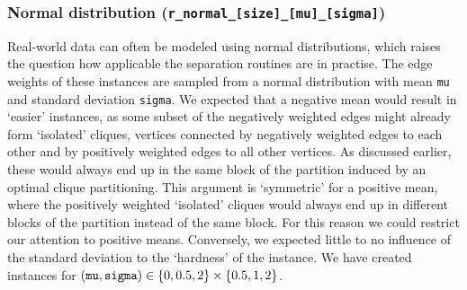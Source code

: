\subsubsection{Normal distribution (\texttt{r\_normal\_[size]\_[mu]\_[sigma]})}\label{subsubsec:data_random_normal}
Real-world data can often be modeled using normal distributions, which raises the question how applicable the separation routines are in practise.
The edge weights of these instances are sampled from a normal distribution with mean \texttt{mu} and standard deviation \texttt{sigma}.
We expected that a negative mean would result in ‘easier’ instances, as some subset of the negatively weighted edges might already form ‘isolated’ cliques, \ie vertices connected by negatively weighted edges to each other and by positively weighted edges to all other vertices.
As discussed earlier, these would always end up in the same block of the partition induced by an optimal clique partitioning.
This argument is ‘symmetric’ for a positive mean, where the positively weighted ‘isolated’ cliques would always end up in different blocks of the partition instead of the same block.
For this reason we could restrict our attention to positive means.
Conversely, we expected little to no influence of the standard deviation to the ‘hardness’ of the instance.
We have created instances for $(\text{\texttt{mu}}, \text{\texttt{sigma}}) \in \left\{ 0, 0.5, 2 \right\} \times \left\{ 0.5, 1, 2 \right\}$.
